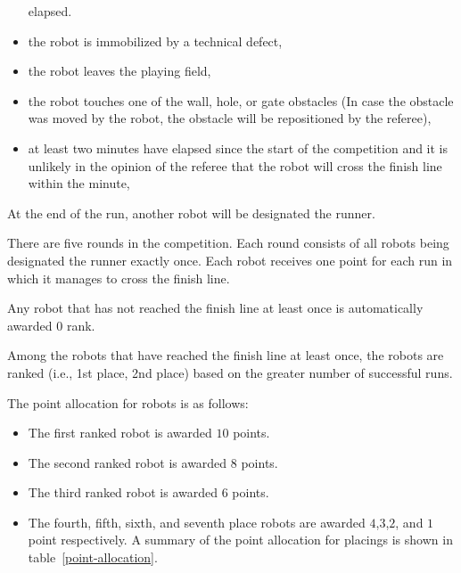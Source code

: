\documentclass[12pt]{hurocup}
\begin{document}
\begin{lawlist}[OR]
\begin{itemize}
    elapsed. 
  \item the robot is immobilized by a technical defect,
  \item the robot leaves the playing field,
  \item the robot touches one of the wall, hole, or gate obstacles (In
    case the obstacle was moved by the robot, the obstacle will be
    repositioned by the referee),
  \item at least two minutes have elapsed since the start of the
    competition and it is unlikely in the opinion of the referee that
    the robot will cross the finish line within the minute,
  \end{itemize}
\end{lawlist}


\begin{lawlist}[OR]
\item At the end of the run, another robot will be designated the
  runner.
\item There are five rounds in the competition. Each round consists of
  all robots being designated the runner exactly once. Each robot
  receives one point for each run in which it manages to cross the
  finish line.
\item Any robot that has not reached the finish line at least once is automatically
  awarded 0 rank.
\item Among the robots that have reached the finish line at least
  once, the robots are ranked (i.e., 1st place, 2nd place) based on
  the greater number of successful runs.

\item The point allocation for robots is as follows:
  \begin{itemize}
  \item The first ranked robot is awarded $10$ points.
  \item The second ranked robot is awarded $8$ points.
  \item The third ranked robot is awarded $6$ points.
  \item The fourth, fifth, sixth, and seventh place robots are awarded
    $4$,$3$,$2$, and $1$ point respectively.  A summary of the point
    allocation for placings is shown in table~\ref{point-allocation}.


\end{itemize}
\end{lawlist}
\end{document}

